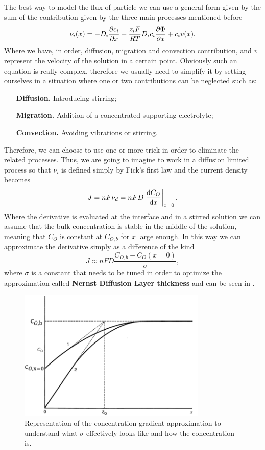 The best way to model the flux of particle we can use a general form given by the sum of the contribution given by the three main processes mentioned before
\begin{equation}
    \nu_i(x) = -D_i\pdv{c_i}{x} - \frac{z_i F}{RT}D_i c_i\pdv{\Phi}{x} + c_iv(x).
\end{equation}
Where we have, in order, diffusion, migration and convection contribution, and $v$ represent the velocity of the solution in a certain point. Obviously such an equation is really complex, therefore we usually need to simplify it by setting ourselves in a situation where one or two contributions can be neglected such as:
\begin{itemize}[align=left, leftmargin=*]
    \item[\textbf{Diffusion.}] Introducing stirring;
    \item[\textbf{Migration.}] Addition of a concentrated supporting electrolyte;
    \item[\textbf{Convection.}] Avoiding vibrations or stirring. 
\end{itemize}
Therefore, we can choose to use one or more trick in order to eliminate the related processes. Thus, we are going to imagine to work in a diffusion limited process so that $\nu_i$ is defined simply by Fick's first law and the current density becomes
\begin{equation}
    J = nF\nu_d = nFD\eval{\dv{C_O}{x}}_{x=0}.
\end{equation} 
Where the derivative is evaluated at the interface and in a stirred solution we can assume that the bulk concentration is stable in the middle of the solution, meaning that $C_O$ is constant at $C_{O,b}$ for $x$ large enough. In this way we can approximate the derivative simply as a difference of the kind
\begin{equation}
    J \approx nFD\frac{C_{O,b} - C_{O}(x=0)}{\sigma},
\end{equation}
where $\sigma$ is a constant that needs to be tuned in order to optimize the approximation called \textbf{Nernst Diffusion Layer thickness} and can be seen in .
\begin{figure}[t]
    \centering
    \includegraphics[width=0.8\textwidth]{Immagini/ApproxDensGrad.png}
    \caption{
        Representation of the concentration gradient approximation to understand what $\sigma$ effectively looks like and how the concentration is.
    }
    \label{fig:ApproxDensGrad}
\end{figure}
